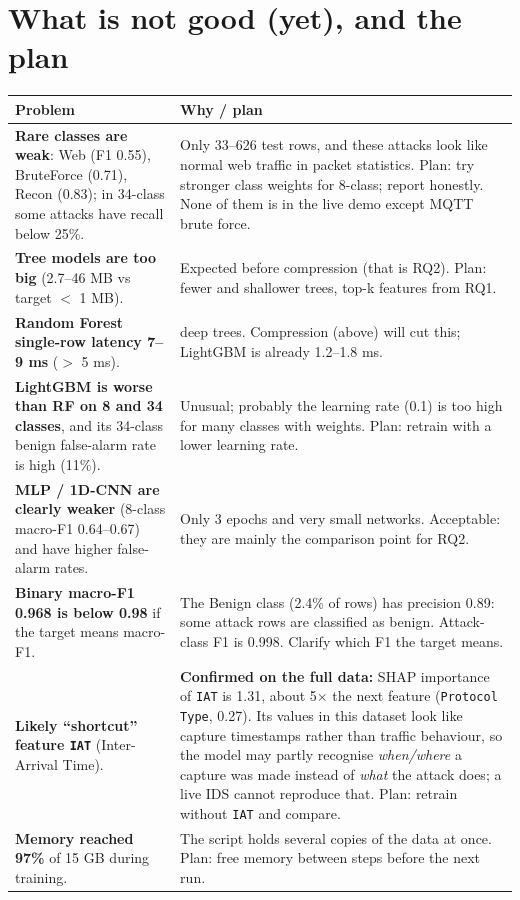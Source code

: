 \documentclass[11pt]{article}
\begin{document}
\section{What is not good (yet), and the plan}
\begin{longtable}{@{}>{\raggedright}p{6.2cm} >{\raggedright\arraybackslash}p{9.8cm}@{}}
\toprule
\textbf{Problem} & \textbf{Why / plan} \\
\midrule
\endhead
\textbf{Rare classes are weak}: Web (F1 0.55), BruteForce (0.71), Recon (0.83); in 34-class some attacks have recall below 25\%. &
Only 33--626 test rows, and these attacks look like normal web traffic in packet statistics. Plan: try stronger class weights for 8-class; report honestly.
None of them is in the live demo except MQTT brute force. \\
\textbf{Tree models are too big} (2.7--46 MB vs target $<$ 1 MB). & Expected before compression (that is RQ2). Plan: fewer and shallower trees, top-k features from RQ1. \\
\textbf{Random Forest single-row latency 7--9 ms} ($>$ 5 ms). & 100 deep trees. Compression (above) will cut this; LightGBM is already 1.2--1.8 ms. \\
\textbf{LightGBM is worse than RF on 8 and 34 classes}, and its 34-class benign false-alarm rate is high (11\%). &
Unusual; probably the learning rate (0.1) is too high for many classes with weights. Plan: retrain with a lower learning rate. \\
\textbf{MLP / 1D-CNN are clearly weaker} (8-class macro-F1 0.64--0.67) and have higher false-alarm rates. &
Only 3 epochs and very small networks. Acceptable: they are mainly the comparison point for RQ2. \\
\textbf{Binary macro-F1 0.968 is below 0.98} if the target means macro-F1. & The Benign class (2.4\% of rows) has precision 0.89: some attack rows are classified as benign. Attack-class F1 is 0.998. Clarify which F1 the target means. \\
\textbf{Likely ``shortcut'' feature \texttt{IAT}} (Inter-Arrival Time). & \textbf{Confirmed on the full data:} SHAP importance of \texttt{IAT} is 1.31, about 5$\times$ the next feature (\texttt{Protocol Type}, 0.27). Its values in this dataset look like capture timestamps rather than traffic behaviour, so the model may partly recognise \emph{when/where} a capture was made instead of \emph{what} the attack does; a live IDS cannot reproduce that. Plan: retrain without \texttt{IAT} and compare. \\
\textbf{Memory reached 97\%} of 15 GB during training. & The script holds several copies of the data at once. Plan: free memory between steps before the next run. \\
\bottomrule
\end{longtable}
\end{document}
